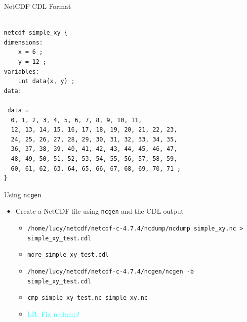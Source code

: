 \documentclass[compress,11pt,xcolor=svgnames,aspectratio=169]{beamer}
\newcommand{\lr}[1]{\textcolor{cyan}{LR: #1}}
\begin{document}
\begin{frame}[fragile]{NetCDF CDL Format}

{\footnotesize

\begin{verbatim}

netcdf simple_xy {
dimensions:
	x = 6 ;
	y = 12 ;
variables:
	int data(x, y) ;
data:

 data =
  0, 1, 2, 3, 4, 5, 6, 7, 8, 9, 10, 11,
  12, 13, 14, 15, 16, 17, 18, 19, 20, 21, 22, 23,
  24, 25, 26, 27, 28, 29, 30, 31, 32, 33, 34, 35,
  36, 37, 38, 39, 40, 41, 42, 43, 44, 45, 46, 47,
  48, 49, 50, 51, 52, 53, 54, 55, 56, 57, 58, 59,
  60, 61, 62, 63, 64, 65, 66, 67, 68, 69, 70, 71 ;
}

\end{verbatim}

}

\end{frame}

\begin{frame}[fragile]{Using \texttt{ncgen}}

\begin{itemize}

  \item Create a NetCDF file using \verb|ncgen| and the CDL output\\[0.4cm]

    \begin{itemize}
    \setlength\itemsep{0.5cm}

      \item \verb|/home/lucy/netcdf/netcdf-c-4.7.4/ncdump/ncdump simple_xy.nc > simple_xy_test.cdl|
      \item \verb|more simple_xy_test.cdl|
      \item \verb|/home/lucy/netcdf/netcdf-c-4.7.4/ncgen/ncgen -b simple_xy_test.cdl|
      \item \verb|cmp simple_xy_test.nc simple_xy.nc|
      \item \lr{Fix ncdump!}

    \end{itemize}

\end{itemize}

\end{frame}
\end{document}
